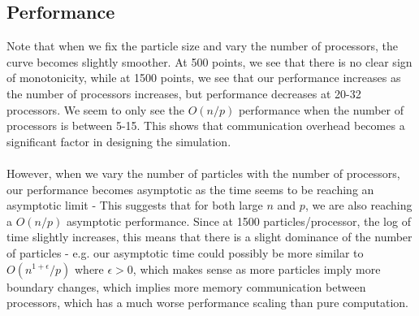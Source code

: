 \documentclass[12pt]{article}
\begin{document}
\clearpage 

\subsection{Performance}
Note that when we fix the particle size and vary the number of processors, the curve becomes slightly smoother. At 500 points, we see that there is no clear sign of monotonicity, while at 1500 points, we see that our performance increases as the number of processors increases, but performance decreases at 20-32 processors. We seem to only see the $O(n/p)$ performance when the number of processors is between 5-15. This shows that communication overhead becomes a significant factor in designing the simulation. 
\\ \\ 
However, when we vary the number of particles with the number of processors, our performance becomes asymptotic as the time seems to be reaching an asymptotic limit - This suggests that for both large $n$ and $p$, we are also reaching a $O(n/p)$ asymptotic performance. Since at 1500 particles/processor, the log of time slightly increases, this means that there is a slight dominance of the number of particles - e.g. our asymptotic time could possibly be more similar to $O(n^{1 + \epsilon}/p)$ where $\epsilon > 0$, which makes sense as more particles imply more boundary changes, which implies more memory communication between processors, which has a much worse performance scaling than pure computation. 
\clearpage 
\end{document}
